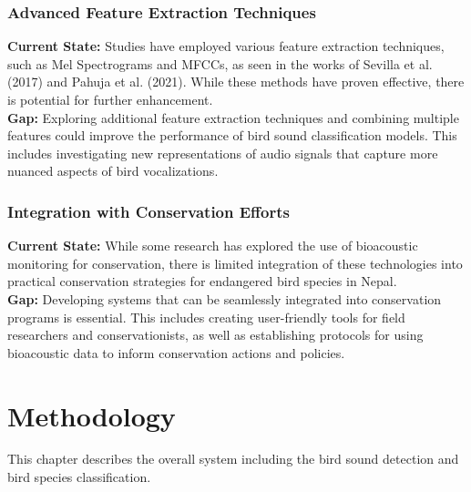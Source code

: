 \subsection{Advanced Feature Extraction Techniques}
\textbf{Current State:} Studies have employed various feature extraction techniques, such as Mel Spectrograms and MFCCs, as seen in the works of Sevilla et al. (2017) and Pahuja et al. (2021). While these methods have proven effective, there is potential for further enhancement.\\
\textbf{Gap:} Exploring additional feature extraction techniques and combining multiple features could improve the performance of bird sound classification models. This includes investigating new representations of audio signals that capture more nuanced aspects of bird vocalizations.

\subsection{Integration with Conservation Efforts}
\textbf{Current State:} While some research has explored the use of bioacoustic monitoring for conservation, there is limited integration of these technologies into practical conservation strategies for endangered bird species in Nepal.\\
\textbf{Gap:} Developing systems that can be seamlessly integrated into conservation programs is essential. This includes creating user-friendly tools for field researchers and conservationists, as well as establishing protocols for using bioacoustic data to inform conservation actions and policies.
\newpage

\chapter{Methodology}
This chapter describes the overall system including the bird sound detection
and bird species classification.

